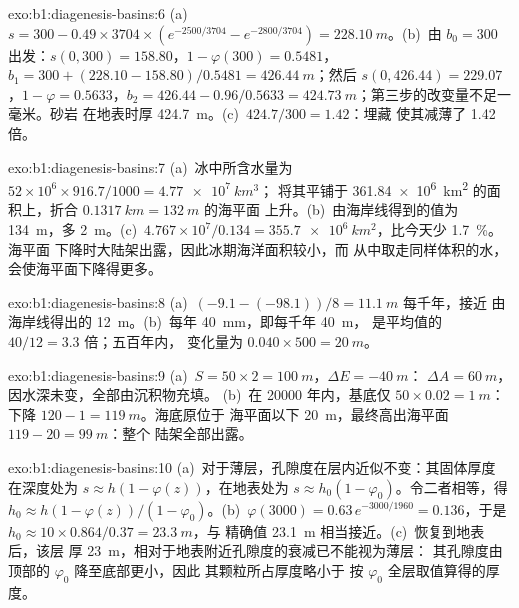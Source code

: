 \begin{solution}{exo:b1:diagenesis-basins:6}
(a)~$s = 300 - 0.49\times3704\times(e^{-2500/3704} - e^{-2800/3704}) =
\qty{228.10}{m}$。(b)~由 $b_0 = 300$ 出发：$s(0, 300) = 158.80$，$1 - \varphi(300) =
0.5481$，$b_1 = 300 + (228.10 - 158.80)/0.5481 = \qty{426.44}{m}$；然后
$s(0, 426.44) = 229.07$，$1 - \varphi = 0.5633$，$b_2 = 426.44 - 0.96/0.5633 =
\qty{424.73}{m}$；第三步的改变量不足一毫米。砂岩
在地表时厚 \qty{424.7}{m}。(c)~$424.7/300 = 1.42$：埋藏
使其减薄了 \num{1.42} 倍。
\end{solution}

\begin{solution}{exo:b1:diagenesis-basins:7}
(a)~冰中所含水量为 $52\times10^6\times916.7/1000 = \qty{4.77e7}{km^3}$；
将其平铺于 \qty{361.84e6}{km^2} 的面积上，折合 $\qty{0.1317}{km} = \qty{132}{m}$ 的海平面
上升。(b)~由海岸线得到的值为 \qty{134}{m}，多 \qty{2}{m}。(c)~$4.767\times
10^7/0.134 = \qty{355.7e6}{km^2}$，比今天少 \qty{1.7}{\%}。海平面
下降时大陆架出露，因此冰期海洋面积较小，而
从中取走同样体积的水，会使海平面下降得更多。
\end{solution}

\begin{solution}{exo:b1:diagenesis-basins:8}
(a)~$(-9.1 - (-98.1))/8 = \qty{11.1}{m}$ 每千年，接近
由海岸线得出的 \qty{12}{m}。(b)~每年 \qty{40}{mm}，即每千年 \qty{40}{m}，
是平均值的 $40/12 = 3.3$ 倍；五百年内，
变化量为 $0.040\times500 = \qty{20}{m}$。
\end{solution}

\begin{solution}{exo:b1:diagenesis-basins:9}
(a)~$S = 50\times2 = \qty{100}{m}$，$\Delta E = \qty{-40}{m}$：
$\Delta A = \qty{60}{m}$，因水深未变，全部由沉积物充填。
(b)~在 \num{20000} 年内，基底仅 $50\times0.02 = \qty{1}{m}$：
下降 $120 - 1 = \qty{119}{m}$。海底原位于
海平面以下 \qty{20}{m}，最终高出海平面 $119 - 20 = \qty{99}{m}$：整个
陆架全部出露。
\end{solution}

\begin{solution}{exo:b1:diagenesis-basins:10}
(a)~对于薄层，孔隙度在层内近似不变：其固体厚度
在深度处为 $s \approx h(1 - \varphi(z))$，在地表处为 $s \approx h_0(1 -
\varphi_0)$。令二者相等，得 $h_0 \approx h(1 -
\varphi(z))/(1 - \varphi_0)$。(b)~$\varphi(3000) = 0.63\,e^{-3000/1960} =
0.136$，于是 $h_0 \approx 10\times0.864/0.37 = \qty{23.3}{m}$，与
精确值 \qty{23.1}{m} 相当接近。(c)~恢复到地表后，该层
厚 \qty{23}{m}，相对于地表附近孔隙度的衰减已不能视为薄层：
其孔隙度由顶部的 $\varphi_0$ 降至底部更小，因此
其颗粒所占厚度略小于
按 $\varphi_0$ 全层取值算得的厚度。
\end{solution}

